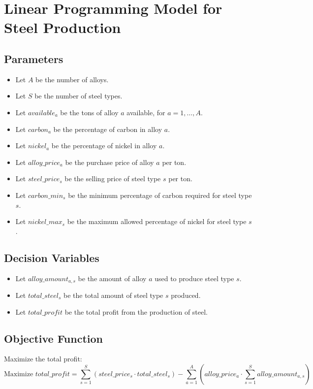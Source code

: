 \documentclass{article}
\begin{document}
\section*{Linear Programming Model for Steel Production}

\subsection*{Parameters}
\begin{itemize}
    \item Let \( A \) be the number of alloys.
    \item Let \( S \) be the number of steel types.
    \item Let \( available_a \) be the tons of alloy \( a \) available, for \( a = 1, \ldots, A \).
    \item Let \( carbon_{a} \) be the percentage of carbon in alloy \( a \).
    \item Let \( nickel_{a} \) be the percentage of nickel in alloy \( a \).
    \item Let \( alloy\_price_{a} \) be the purchase price of alloy \( a \) per ton.
    \item Let \( steel\_price_{s} \) be the selling price of steel type \( s \) per ton.
    \item Let \( carbon\_min_{s} \) be the minimum percentage of carbon required for steel type \( s \).
    \item Let \( nickel\_max_{s} \) be the maximum allowed percentage of nickel for steel type \( s \).
\end{itemize}

\subsection*{Decision Variables}
\begin{itemize}
    \item Let \( alloy\_amount_{a,s} \) be the amount of alloy \( a \) used to produce steel type \( s \).
    \item Let \( total\_steel_{s} \) be the total amount of steel type \( s \) produced.
    \item Let \( total\_profit \) be the total profit from the production of steel.
\end{itemize}

\subsection*{Objective Function}
Maximize the total profit:
\[
\text{Maximize } total\_profit = \sum_{s=1}^{S} (steel\_price_{s} \cdot total\_steel_{s}) - \sum_{a=1}^{A} (alloy\_price_{a} \cdot \sum_{s=1}^{S} alloy\_amount_{a,s})
\]
\end{document}
